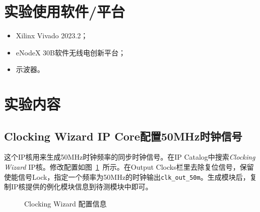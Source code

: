 \section{实验使用软件/平台}
\begin{itemize}
  \item Xilinx Vivado 2023.2；
  \item eNodeX 30B软件无线电创新平台；
  \item 示波器。
\end{itemize}
\section{实验内容}
\subsection{Clocking Wizard IP Core配置50MHz时钟信号}
这个IP核用来生成50MHz时钟频率的同步时钟信号。在IP Catalog中搜索\textit{Clocking Wizard} IP核。修改配置如图~\ref{fig:exp3:clk-1}~所示。在Output Clocks栏里去除复位信号，保留使能信号Lock，指定一个频率为50MHz的时钟输出\texttt{clk\_out\_50m}。生成模块后，复制IP核提供的例化模块信息到待测模块中即可。

\begin{figure}[htbp]
  \centering
  \hfill
  \caption{Clocking Wizard 配置信息}
  \label{fig:exp3:clk-1}
\end{figure}



